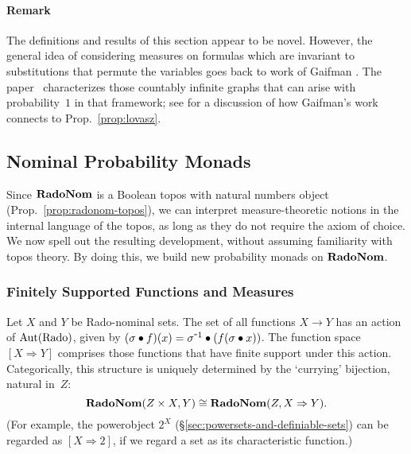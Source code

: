     \paragraph*{Remark}
The definitions and results of this section appear to be novel. 
    However, the general idea of considering measures on formulas which are invariant to substitutions that permute the variables
goes back to work of Gaifman \cite{MR175755}.
The paper~\cite{MR3515800}
characterizes those countably infinite graphs that can arise with probability~$1$ in that framework;
see \cite{properly-ergodic}
for a discussion of how Gaifman's work connects to
Prop.~\ref{prop:lovasz}.

\subsection{Nominal Probability Monads}
\label{sec:nom-monad}
Since $\mathbf{RadoNom}$ is a Boolean topos with natural numbers object
(Prop.~\ref{prop:radonom-topos}), we can interpret measure-theoretic
notions in the internal language of the topos, as long as they do not
require the axiom of choice. We now spell out the resulting development, without assuming familiarity with topos theory. By doing this, we build new probability
monads on $\mathbf{RadoNom}$. %

\subsubsection{Finitely Supported Functions and Measures}
Let $X$ and $Y$ be Rado-nominal sets.
The set of all functions $X\to Y$ has an action of $\operatorname{Aut}(\mathrm{Rado})$,
given by $(\sigma\bullet f)(x)=\sigma\inv\bullet (f(\sigma\bullet
x))$. The function space $[X\Rightarrow Y]$ comprises those
functions that have finite support under this action. Categorically,
this structure is uniquely determined by the `currying' bijection, natural in~$Z$:
\[
  \mathbf{RadoNom}(Z\times X,Y)\cong \mathbf{RadoNom}(Z,X\Rightarrow Y)\text .
\]
(For example, the powerobject $2^X$ (\S\ref{sec:powersets-and-definiable-sets}) can be regarded as
$[X\Rightarrow 2]$, if we regard a set as its characteristic
function.)

